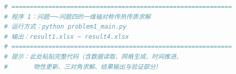 \documentclass[12pt,a4paper]{article}
\newcommand{\tip}[1]{\par\noindent\textbf{【提示】} #1\par}
\begin{document}
\begin{lstlisting}[language=Python,caption={程序清单占位（请替换为完整代码）}]
# ============================================================
# 程序 1：问题一~问题四的一维轴对称传热传质求解
# 运行方式：python problem1_main.py
# 输出：result1.xlsx ~ result4.xlsx
# ============================================================
# 提示：此处粘贴完整代码（含数据读取、网格生成、时间推进、
#       物性更新、三对角求解、结果输出与验证部分）
\end{lstlisting}
% 
% 
% 
% 
% 
% 
% 
% 
% 
\end{document}
